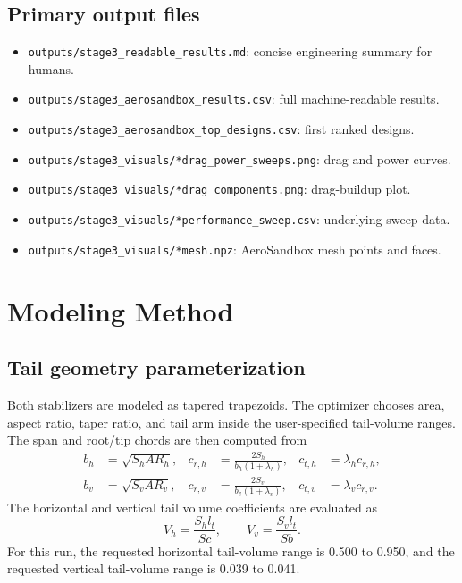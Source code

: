 \documentclass[11pt]{article}
\begin{document}
\subsection{Primary output files}
\begin{itemize}[leftmargin=*]
\item \texttt{outputs/stage3\_readable\_results.md}: concise engineering summary for humans.
\item \texttt{outputs/stage3\_aerosandbox\_results.csv}: full machine-readable results.
\item \texttt{outputs/stage3\_aerosandbox\_top\_designs.csv}: first ranked designs.
\item \texttt{outputs/stage3\_visuals/*drag\_power\_sweeps.png}: drag and power curves.
\item \texttt{outputs/stage3\_visuals/*drag\_components.png}: drag-buildup plot.
\item \texttt{outputs/stage3\_visuals/*performance\_sweep.csv}: underlying sweep data.
\item \texttt{outputs/stage3\_visuals/*mesh.npz}: AeroSandbox mesh points and faces.
\end{itemize}

\section{Modeling Method}
\subsection{Tail geometry parameterization}
Both stabilizers are modeled as tapered trapezoids. The optimizer chooses area, aspect ratio, taper ratio, and tail arm inside the user-specified tail-volume ranges. The span and root/tip chords are then computed from
\begin{align}
b_h &= \sqrt{S_h AR_h}, & c_{r,h} &= \frac{2S_h}{b_h(1+\lambda_h)}, & c_{t,h} &= \lambda_h c_{r,h}, \\
b_v &= \sqrt{S_v AR_v}, & c_{r,v} &= \frac{2S_v}{b_v(1+\lambda_v)}, & c_{t,v} &= \lambda_v c_{r,v}.
\end{align}
The horizontal and vertical tail volume coefficients are evaluated as
\begin{equation}
V_h = \frac{S_h l_t}{S c}, \qquad V_v = \frac{S_v l_t}{S b}.
\end{equation}
For this run, the requested horizontal tail-volume range is 0.500 to 0.950, and the requested vertical tail-volume range is 0.039 to 0.041.
\end{document}
